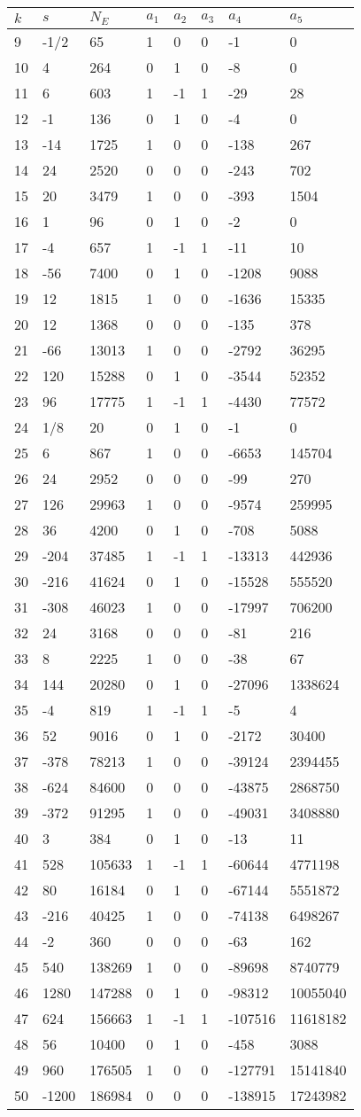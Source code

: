 \documentclass{amsart}
\begin{document}
\begin{longtable}{|l|l|l|lllll|}
\hline
$k$ & $s$ & $N_E$ & $a_1$ & $a_2$ & $a_3$ & $a_4$ & $a_5$\\
\hline
9&-1/2&65&1&0&0&-1&0\\
10&4&264&0&1&0&-8&0\\
11&6&603&1&-1&1&-29&28\\
12&-1&136&0&1&0&-4&0\\
13&-14&1725&1&0&0&-138&267\\
14&24&2520&0&0&0&-243&702\\
15&20&3479&1&0&0&-393&1504\\
16&1&96&0&1&0&-2&0\\
17&-4&657&1&-1&1&-11&10\\
18&-56&7400&0&1&0&-1208&9088\\
19&12&1815&1&0&0&-1636&15335\\
20&12&1368&0&0&0&-135&378\\
21&-66&13013&1&0&0&-2792&36295\\
22&120&15288&0&1&0&-3544&52352\\
23&96&17775&1&-1&1&-4430&77572\\
24&1/8&20&0&1&0&-1&0\\
25&6&867&1&0&0&-6653&145704\\
26&24&2952&0&0&0&-99&270\\
27&126&29963&1&0&0&-9574&259995\\
28&36&4200&0&1&0&-708&5088\\
29&-204&37485&1&-1&1&-13313&442936\\
30&-216&41624&0&1&0&-15528&555520\\
31&-308&46023&1&0&0&-17997&706200\\
32&24&3168&0&0&0&-81&216\\
33&8&2225&1&0&0&-38&67\\
34&144&20280&0&1&0&-27096&1338624\\
35&-4&819&1&-1&1&-5&4\\
36&52&9016&0&1&0&-2172&30400\\
37&-378&78213&1&0&0&-39124&2394455\\
38&-624&84600&0&0&0&-43875&2868750\\
39&-372&91295&1&0&0&-49031&3408880\\
40&3&384&0&1&0&-13&11\\
41&528&105633&1&-1&1&-60644&4771198\\
42&80&16184&0&1&0&-67144&5551872\\
43&-216&40425&1&0&0&-74138&6498267\\
44&-2&360&0&0&0&-63&162\\
45&540&138269&1&0&0&-89698&8740779\\
46&1280&147288&0&1&0&-98312&10055040\\
47&624&156663&1&-1&1&-107516&11618182\\
48&56&10400&0&1&0&-458&3088\\
49&960&176505&1&0&0&-127791&15141840\\
50&-1200&186984&0&0&0&-138915&17243982\\
\hline
\end{longtable}
\end{document}
